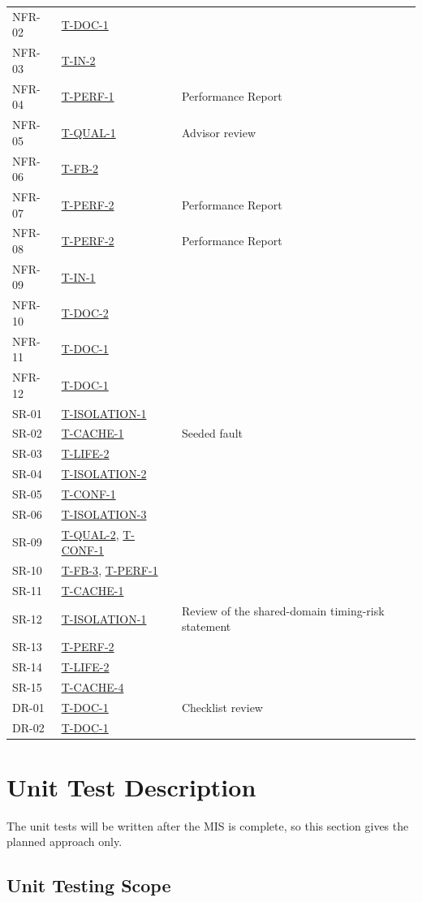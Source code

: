 \documentclass[12pt, titlepage]{article}
\newcommand{\tref}[1]{\hyperref[test:#1]{#1}}
\begin{document}
\begin{longtable}{@{}p{}p{}p{}@{}}
NFR-02 & \tref{T-DOC-1} & \\
NFR-03 & \tref{T-IN-2} & \\
NFR-04 & \tref{T-PERF-1} & Performance Report\\
NFR-05 & \tref{T-QUAL-1} & Advisor review\\
NFR-06 & \tref{T-FB-2} & \\
NFR-07 & \tref{T-PERF-2} & Performance Report\\
NFR-08 & \tref{T-PERF-2} & Performance Report\\
NFR-09 & \tref{T-IN-1} & \\
NFR-10 & \tref{T-DOC-2} & \\
NFR-11 & \tref{T-DOC-1} & \\
NFR-12 & \tref{T-DOC-1} & \\
SR-01 & \tref{T-ISOLATION-1} & \\
SR-02 & \tref{T-CACHE-1} & Seeded fault\\
SR-03 & \tref{T-LIFE-2} & \\
SR-04 & \tref{T-ISOLATION-2} & \\
SR-05 & \tref{T-CONF-1} & \\
SR-06 & \tref{T-ISOLATION-3} & \\
SR-09 & \tref{T-QUAL-2}, \tref{T-CONF-1} & \\
SR-10 & \tref{T-FB-3}, \tref{T-PERF-1} & \\
SR-11 & \tref{T-CACHE-1} & \\
SR-12 & \tref{T-ISOLATION-1} & Review of the shared-domain timing-risk statement\\
SR-13 & \tref{T-PERF-2} & \\
SR-14 & \tref{T-LIFE-2} & \\
SR-15 & \tref{T-CACHE-4} & \\
DR-01 & \tref{T-DOC-1} & Checklist review\\
DR-02 & \tref{T-DOC-1} & \\
\bottomrule
\end{longtable}

\section{Unit Test Description}
\label{sec:unit}

The unit tests will be written after the MIS \citep{TandemMIS} is
complete, so this section gives the planned approach only.

\subsection{Unit Testing Scope}
\end{document}

